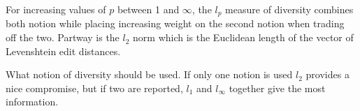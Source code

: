 \documentclass{article}
\begin{document}
  For increasing values of $p$ between 1 and $\infty$, the $l_p$
  measure of diversity combines both notion while placing increasing
  weight on the second notion when trading off the two.  Partway is
  the $l_2$ norm which is the Euclidean length of the vector of
  Levenshtein edit distances.

  What notion of diversity should be used.  If only one notion is used
  $l_2$ provides a nice compromise, but if two are reported, $l_1$ and
  $l_\infty$ together give the most information.

  
\end{document}
